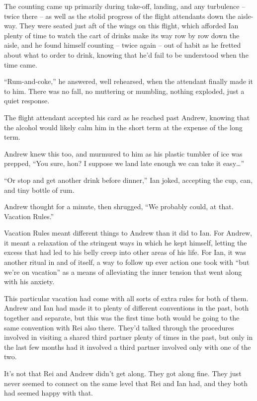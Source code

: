 The counting came up primarily during take-off, landing, and any turbulence -- twice there -- as well as the stolid progress of the flight attendants down the aisle-way. They were seated just aft of the wings on this flight, which afforded Ian plenty of time to watch the cart of drinks make its way row by row down the aisle, and he found himself counting -- twice again -- out of habit as he fretted about what to order to drink, knowing that he'd fail to be understood when the time came.

``Rum-and-coke,'' he answered, well rehearsed, when the attendant finally made it to him. There was no fall, no muttering or mumbling, nothing exploded, just a quiet response.

The flight attendant accepted his card as he reached past Andrew, knowing that the alcohol would likely calm him in the short term at the expense of the long term.

Andrew knew this too, and murmured to him as his plastic tumbler of ice was prepped, ``You sure, hon? I suppose we land late enough we can take it easy\ldots{}''

``Or stop and get another drink before dinner,'' Ian joked, accepting the cup, can, and tiny bottle of rum.

Andrew thought for a minute, then shrugged, ``We probably could, at that. Vacation Rules.''

Vacation Rules meant different things to Andrew than it did to Ian. For Andrew, it meant a relaxation of the stringent ways in which he kept himself, letting the excess that had led to his belly creep into other areas of his life. For Ian, it was another ritual in and of itself, a way to follow up ever action one took with ``but we're on vacation'' as a means of alleviating the inner tension that went along with his anxiety.

This particular vacation had come with all sorts of extra rules for both of them. Andrew and Ian had made it to plenty of different conventions in the past, both together and separate, but this was the first time both would be going to the same convention with Rei also there. They'd talked through the procedures involved in visiting a shared third partner plenty of times in the past, but only in the last few months had it involved a third partner involved only with one of the two.

It's not that Rei and Andrew didn't get along. They got along fine. They just never seemed to connect on the same level that Rei and Ian had, and they both had seemed happy with that.

